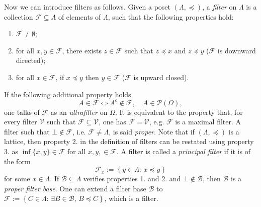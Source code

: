 \documentclass[11pt,british,reqno]{article}
\numberwithin{equation}{section}
\numberwithin{figure}{section}
\numberwithin{table}{section}
\theoremstyle{definition}
\theoremstyle{definition}
\theoremstyle{plain}
\theoremstyle{plain}
\theoremstyle{remark}
\theoremstyle{plain}
\numberwithin{equation}{section}
\numberwithin{figure}{section}
\numberwithin{table}{section}
\theoremstyle{plain}
\begin{document}
Now we can introduce filters as follows. Given a poset  $(\Lambda,\preceq)$,
a\textit{ filter} on $\Lambda$ is a collection $\mathcal{F}\subseteq\Lambda$
of elements of $\Lambda$, such that the following properties hold: 
\begin{enumerate}
\item $\mathcal{F}\neq\emptyset$; 
\item for all $x,y\in\mathcal{F}$, there exists $z\in\mathcal{F}$ such
that $z\preceq x$ and $z\preceq y$ ($\mathcal{F}$ is downward directed); 
\item for all $x\in\mathcal{F}$, if $x\preceq y$ then $y\in\mathcal{F}$
($\mathcal{F}$ is upward closed). 
\end{enumerate}
If the following additional property holds 
\begin{equation}
A\in\mathcal{F}\Leftrightarrow A^{c}\notin\mathcal{F},\quad A\in\mathcal{P}(\Omega),\label{eq: ultrafilter property}
\end{equation}
one talks of $\mathcal{F}$ as an \textit{ultrafilter} on $\Omega$.
It is equivalent to the property that, for every filter $\mathcal{V}$
such that $\mathcal{F\subseteq V}$, one has $\mathcal{F=V}$, e.g.
$\mathcal{F}$ is a maximal filter. A filter such that $\bot\notin\mathcal{F}$,
i.e. $\mathcal{F}\neq\Lambda$, is said \textit{proper}. Note that
if $(\Lambda,\preceq)$ is a lattice, then property 2. in the definition of filters can be restated using property 3. as $\inf\{x,y\}\in\mathcal{F}$
for all $x,y,\in\mathcal{F}$. A filter is called a \textit{principal
filter} if it is of the form 
\begin{equation}
\mathcal{F}_{x}:=\left\{ y\in\Lambda:\,x\preceq y\right\} \label{eq: principal filter}
\end{equation}
for some $x\in\Lambda$. If $\mathcal{B}\subseteq\Lambda$ verifies
properties 1. and 2. and $\bot\notin\mathcal{B}$, then $\mathcal{B}$
is a \textit{proper filter base}. One can extend a filter base $\mathcal{B}$
to $\mathcal{F}:=\left\{ C\in\Lambda:\,\exists B\in\mathcal{B},\,B\preceq C\right\} $,
which is a filter. 
\end{document}
